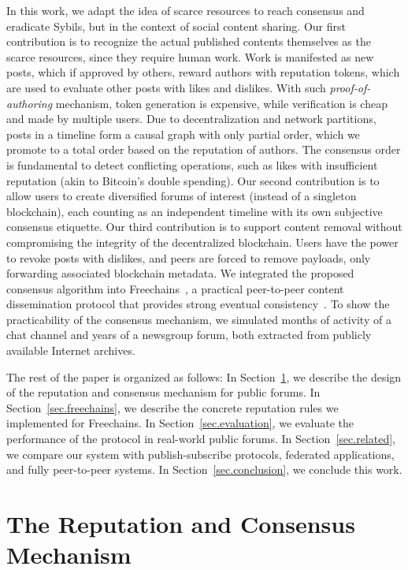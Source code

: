 \documentclass[12pt]{article}
\newcommand{\FC}       {Freechains\xspace}
\begin{document}
In this work, we adapt the idea of scarce resources to reach consensus and
eradicate Sybils, but in the context of social content sharing.
%
Our first contribution is to recognize the actual published contents themselves
as the scarce resources, since they require human work.
%
Work is manifested as new posts, which if approved by others, reward authors
with reputation tokens, which are used to evaluate other posts with likes and
dislikes.
With such \emph{proof-of-authoring} mechanism, token generation is expensive,
while verification is cheap and made by multiple users.
%
Due to decentralization and network partitions, posts in a timeline form a
causal graph with only partial order, which we promote to a total order based
on the reputation of authors.
The consensus order is fundamental to detect conflicting operations, such as
likes with insufficient reputation (akin to Bitcoin's double spending).
%
Our second contribution is to allow users to create diversified forums of
interest (instead of a singleton blockchain), each counting as an independent
timeline with its own subjective consensus etiquette.
%
Our third contribution is to support content removal without compromising the
integrity of the decentralized blockchain.
Users have the power to revoke posts with dislikes, and peers are forced to
remove payloads, only forwarding associated blockchain metadata.
%
We integrated the proposed consensus algorithm into \FC~\cite{fcs.sbseg20}, a
practical peer-to-peer content dissemination protocol that provides strong
eventual consistency~\cite{p2p.crdts,p2p.sec}.
%
To show the practicability of the consensus mechanism, we simulated months of
activity of a chat channel and years of a newsgroup forum, both extracted from
publicly available Internet archives.

The rest of the paper is organized as follows:
In Section~\ref{sec.design}, we describe the design of the reputation and
consensus mechanism for public forums.
In Section~\ref{sec.freechains}, we describe the concrete reputation rules we
implemented for \FC.
In Section~\ref{sec.evaluation}, we evaluate the performance of the protocol
in real-world public forums.
In Section~\ref{sec.related}, we compare our system with publish-subscribe
protocols, federated applications, and fully peer-to-peer systems.
In Section~\ref{sec.conclusion}, we conclude this work.

\section{The Reputation and Consensus Mechanism}
\label{sec.design}
\end{document}
